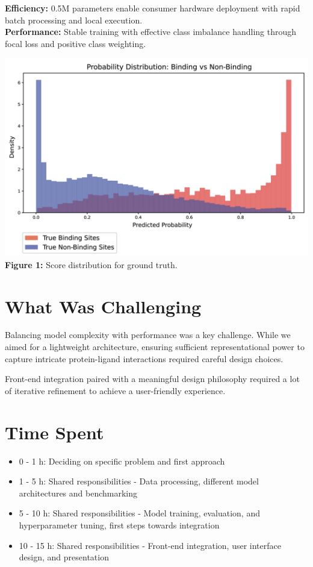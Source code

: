 \documentclass[11pt,a4paper]{article}
\begin{document}
\begin{multicols}{2}
\textbf{Efficiency:} 0.5M parameters enable consumer hardware deployment with rapid batch processing and local execution. \\

\textbf{Performance:} Stable training with effective class imbalance handling through focal loss and positive class weighting.

\begin{center}
\includegraphics[width=1\columnwidth]{fig1mod.png}
\\[0.1cm]
\textbf{Figure 1:} Score distribution for ground truth.
\end{center}

\section{What Was Challenging}
Balancing model complexity with performance was a key challenge. While we aimed for a lightweight architecture, ensuring sufficient representational power to capture intricate protein-ligand interactions required careful design choices.

Front-end integration paired with a meaningful design philosophy required a lot of iterative refinement to achieve a user-friendly experience.

\section{Time Spent}
\begin{itemize}
    \item 0 - 1 h: Deciding on specific problem and first approach
    \item 1 - 5 h: Shared responsibilities - Data processing, different model architectures and benchmarking
    \item 5 - 10 h: Shared responsibilities - Model training, evaluation, and hyperparameter tuning, first steps towards integration
    \item 10 - 15 h: Shared responsibilities - Front-end integration, user interface design, and presentation
\end{itemize}



\end{multicols}
\end{document}
